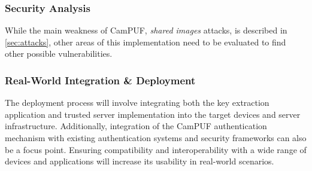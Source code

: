 \subsubsection{Security Analysis}

While the main weakness of CamPUF, \emph{shared images} attacks, is described in \ref{sec:attacks}, other areas of this implementation need to be evaluated to find other possible vulnerabilities.

\subsubsection{Real-World Integration \& Deployment}

The deployment process will involve integrating both the key extraction application and trusted server implementation into the target devices and server infrastructure. Additionally, integration of the CamPUF authentication mechanism with existing authentication systems and security frameworks can also be a focus point. Ensuring compatibility and interoperability with a wide range of devices and applications will increase its usability in real-world scenarios.